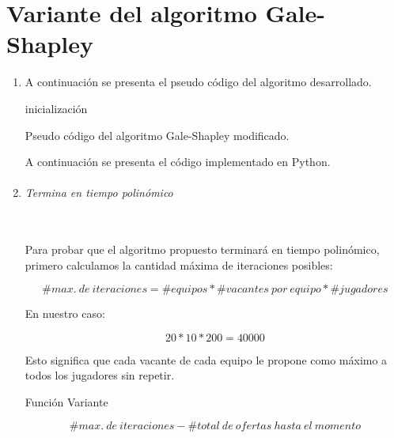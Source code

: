 \documentclass{article}
\begin{document}
\part{Variante del algoritmo Gale-Shapley}
\begin{enumerate}
    \item A continuación se presenta el pseudo código del algoritmo desarrollado.\\
        \begin{algorithm}[H]
            \SetAlgoLined
            inicialización\;
            \caption{Pseudo código del algoritmo Gale-Shapley modificado.}
        \end{algorithm}
        
    A continuación se presenta el código implementado en Python.\\

        
    \item 
        \paragraph{Termina en tiempo polinómico}\mbox{}\\
        Para probar que el algoritmo propuesto terminará en tiempo polinómico, primero calculamos la cantidad máxima de iteraciones posibles: 

        $$\# max.\ de\ iteraciones = \# equipos * \# vacantes\ por\ equipo * \# jugadores$$

        En nuestro caso:

        $$ 20 * 10 * 200 = 40000$$

        Esto significa que cada vacante de cada equipo le propone como máximo a todos los jugadores sin repetir.
        \subparagraph{Función Variante}
        $$ \# max.\ de\ iteraciones - \# total\ de\ ofertas\ hasta\ el\ momento$$


\end{enumerate}
\end{document}
